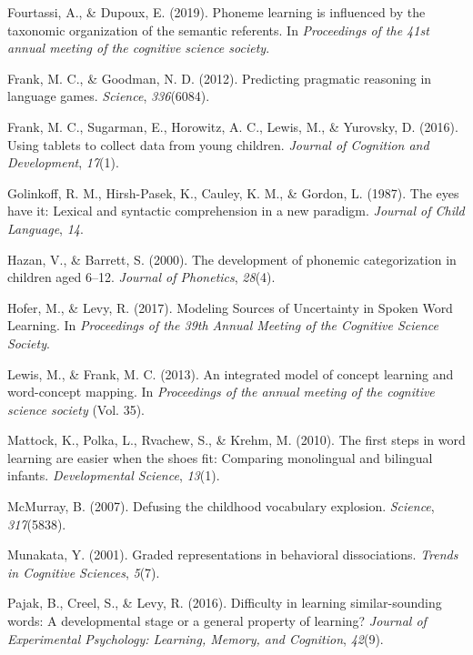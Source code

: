 \documentclass[english,,man]{apa6}
\begin{document}
\leavevmode\hypertarget{ref-fourtassi2019}{}%
Fourtassi, A., \& Dupoux, E. (2019). Phoneme learning is influenced by the taxonomic organization of the semantic referents. In \emph{Proceedings of the 41st annual meeting of the cognitive science society}.

\leavevmode\hypertarget{ref-frank2012}{}%
Frank, M. C., \& Goodman, N. D. (2012). Predicting pragmatic reasoning in language games. \emph{Science}, \emph{336}(6084).

\leavevmode\hypertarget{ref-frank2016}{}%
Frank, M. C., Sugarman, E., Horowitz, A. C., Lewis, M., \& Yurovsky, D. (2016). Using tablets to collect data from young children. \emph{Journal of Cognition and Development}, \emph{17}(1).

\leavevmode\hypertarget{ref-golinkoff1987}{}%
Golinkoff, R. M., Hirsh-Pasek, K., Cauley, K. M., \& Gordon, L. (1987). The eyes have it: Lexical and syntactic comprehension in a new paradigm. \emph{Journal of Child Language}, \emph{14}.

\leavevmode\hypertarget{ref-hazan2000}{}%
Hazan, V., \& Barrett, S. (2000). The development of phonemic categorization in children aged 6--12. \emph{Journal of Phonetics}, \emph{28}(4).

\leavevmode\hypertarget{ref-hofer2017}{}%
Hofer, M., \& Levy, R. (2017). Modeling Sources of Uncertainty in Spoken Word Learning. In \emph{Proceedings of the 39th Annual Meeting of the Cognitive Science Society}.

\leavevmode\hypertarget{ref-lewis2013}{}%
Lewis, M., \& Frank, M. C. (2013). An integrated model of concept learning and word-concept mapping. In \emph{Proceedings of the annual meeting of the cognitive science society} (Vol. 35).

\leavevmode\hypertarget{ref-Mattock2010}{}%
Mattock, K., Polka, L., Rvachew, S., \& Krehm, M. (2010). The first steps in word learning are easier when the shoes fit: Comparing monolingual and bilingual infants. \emph{Developmental Science}, \emph{13}(1).

\leavevmode\hypertarget{ref-McMurray2007}{}%
McMurray, B. (2007). Defusing the childhood vocabulary explosion. \emph{Science}, \emph{317}(5838).

\leavevmode\hypertarget{ref-Munakata2001}{}%
Munakata, Y. (2001). Graded representations in behavioral dissociations. \emph{Trends in Cognitive Sciences}, \emph{5}(7).

\leavevmode\hypertarget{ref-pajak2016}{}%
Pajak, B., Creel, S., \& Levy, R. (2016). Difficulty in learning similar-sounding words: A developmental stage or a general property of learning? \emph{Journal of Experimental Psychology: Learning, Memory, and Cognition}, \emph{42}(9).
\end{document}
